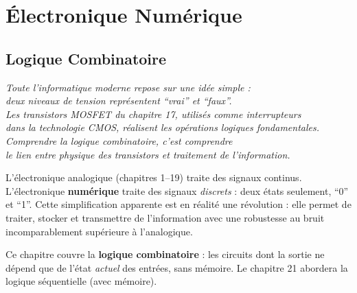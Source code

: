 \documentclass[12pt,a4paper,twoside]{book}
\begin{document}
\part{Électronique Numérique}


\chapter{Logique Combinatoire}

\begin{center}
\textit{Toute l'informatique moderne repose sur une idée simple :\\
deux niveaux de tension représentent ``vrai'' et ``faux''.\\
Les transistors MOSFET du chapitre 17, utilisés comme interrupteurs\\
dans la technologie CMOS, réalisent les opérations logiques fondamentales.\\
Comprendre la logique combinatoire, c'est comprendre\\
le lien entre physique des transistors et traitement de l'information.}
\end{center}

\vspace{0.5cm}

L'électronique analogique (chapitres 1--19) traite des signaux continus. L'électronique \textbf{numérique} traite des signaux \textit{discrets} : deux états seulement, ``0'' et ``1''. Cette simplification apparente est en réalité une révolution : elle permet de traiter, stocker et transmettre de l'information avec une robustesse au bruit incomparablement supérieure à l'analogique.

Ce chapitre couvre la \textbf{logique combinatoire} : les circuits dont la sortie ne dépend que de l'état \textit{actuel} des entrées, sans mémoire. Le chapitre 21 abordera la logique séquentielle (avec mémoire).
\end{document}
